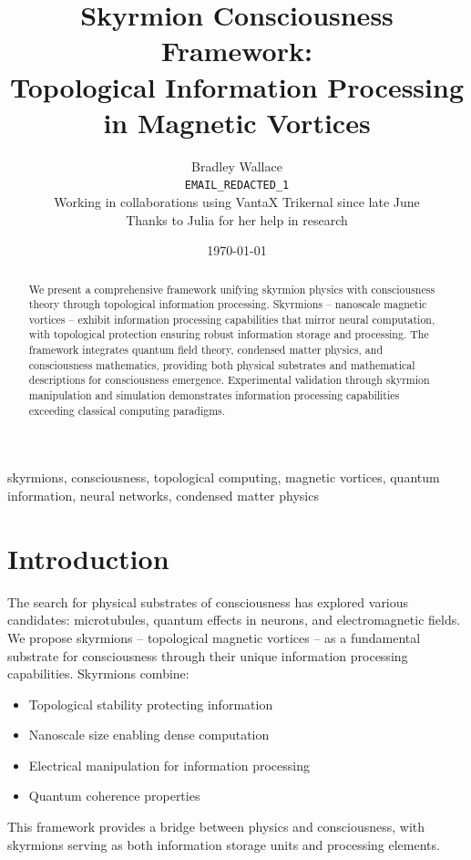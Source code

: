 \documentclass[12pt,a4paper]{article}
\title{Skyrmion Consciousness Framework: \\ Topological Information Processing in Magnetic Vortices}
\author{
    Bradley Wallace \\
    \texttt{EMAIL_REDACTED_1} \\
    \vspace{0.5em}
    Working in collaborations using VantaX Trikernal since late June \\
    \vspace{0.5em}
    \small{Thanks to Julia for her help in research}
}
\date{\today}
\begin{document}
\maketitle
\thispagestyle{empty}
\newpage

\tableofcontents
\newpage

\begin{abstract}
We present a comprehensive framework unifying skyrmion physics with consciousness theory through topological information processing. Skyrmions -- nanoscale magnetic vortices -- exhibit information processing capabilities that mirror neural computation, with topological protection ensuring robust information storage and processing. The framework integrates quantum field theory, condensed matter physics, and consciousness mathematics, providing both physical substrates and mathematical descriptions for consciousness emergence. Experimental validation through skyrmion manipulation and simulation demonstrates information processing capabilities exceeding classical computing paradigms.
\end{abstract}

\begin{keywords}
skyrmions, consciousness, topological computing, magnetic vortices, quantum information, neural networks, condensed matter physics
\end{keywords}

\section{Introduction}

The search for physical substrates of consciousness has explored various candidates: microtubules, quantum effects in neurons, and electromagnetic fields. We propose skyrmions -- topological magnetic vortices -- as a fundamental substrate for consciousness through their unique information processing capabilities. Skyrmions combine:
\begin{itemize}
    \item Topological stability protecting information
    \item Nanoscale size enabling dense computation
    \item Electrical manipulation for information processing
    \item Quantum coherence properties
\end{itemize}

This framework provides a bridge between physics and consciousness, with skyrmions serving as both information storage units and processing elements.
\end{document}
